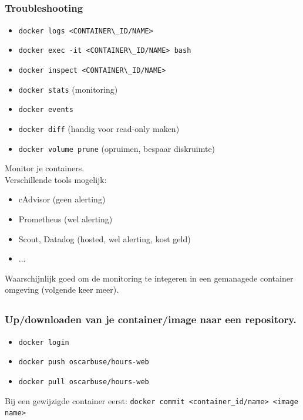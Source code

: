 \subsection{}
\begin{styleframefrag}
    \frametitle{Troubleshooting}
\begin{itemize}
	\pause
	\item \verb!docker logs <CONTAINER\_ID/NAME>!
	\pause
	\item \verb!docker exec -it <CONTAINER\_ID/NAME> bash!
	\pause
	\item \verb!docker inspect <CONTAINER\_ID/NAME>!
	\pause
	\item \verb!docker stats! (monitoring)
	\pause
	\item \verb!docker events!
	\pause
	\item \verb!docker diff! (handig voor read-only maken)
	\pause
	\item \verb!docker volume prune! (opruimen, bespaar diskruimte)
\end{itemize}
\pause
Monitor je containers.\\
\pause
Verschillende tools mogelijk:
\begin{itemize}
	\pause
	\item cAdvisor (geen alerting)
	\pause
	\item Prometheus (wel alerting)
	\pause
	\item Scout, Datadog (hosted, wel alerting, kost geld)
	\item ...
	\pause
\end{itemize}
Waarschijnlijk goed om de monitoring te integeren in een gemanagede container omgeving (volgende keer meer).
\end{styleframefrag}

\subsection{}
\begin{styleframefrag}
    \frametitle{Up/downloaden van je container/image naar een repository.}
\begin{itemize}
	\pause
	\item \verb!docker login!
	\pause
	\item \verb!docker push oscarbuse/hours-web!
	\pause
	\item \verb!docker pull oscarbuse/hours-web!
\end{itemize}
\pause
Bij een gewijzigde container eerst: \verb!docker commit <container_id/name> <image name>!
\end{styleframefrag}


